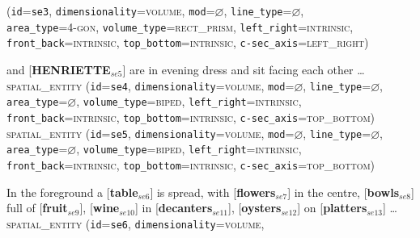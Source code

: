 \documentclass[11pt]{article}
\newcommand{\entity}[2]{[\textbf{\color{darkblue}#1}$_{se#2}$]}
\begin{document}
{            (\texttt{id}=\texttt{se3},
            \texttt{dimensionality}=\textsc{volume},
            \texttt{mod}=$\varnothing$,
            \texttt{line\_type}=$\varnothing$,\\
            \texttt{area\_type}=\textsc{4-gon},
            \texttt{volume\_type}=\textsc{rect\_prism},
            \texttt{left\_right}=\textsc{intrinsic},\\
            \texttt{front\_back}=\textsc{intrinsic},
            \texttt{top\_bottom}=\textsc{intrinsic},
            \texttt{c-sec\_axis}=\textsc{left\_right})
        \label{ex:sofa}
	\item \entity{MAURICE}{4} and \entity{HENRIETTE}{5} are in evening dress and sit facing each other \ldots\vspace{0.5em}\\
        \textsc{spatial\_entity}
            (\texttt{id}=\texttt{se4},
            \texttt{dimensionality}=\textsc{volume},
            \texttt{mod}=$\varnothing$,
            \texttt{line\_type}=$\varnothing$,\\
            \texttt{area\_type}=$\varnothing$,
            \texttt{volume\_type}=\textsc{biped},
            \texttt{left\_right}=\textsc{intrinsic},
            \texttt{front\_back}=\textsc{intrinsic},
            \texttt{top\_bottom}=\textsc{intrinsic},
            \texttt{c-sec\_axis}=\textsc{top\_bottom})\vspace{0.5em}\\
        \textsc{spatial\_entity}
            (\texttt{id}=\texttt{se5},
            \texttt{dimensionality}=\textsc{volume},
            \texttt{mod}=$\varnothing$,
            \texttt{line\_type}=$\varnothing$,\\
            \texttt{area\_type}=$\varnothing$,
            \texttt{volume\_type}=\textsc{biped},
            \texttt{left\_right}=\textsc{intrinsic},
            \texttt{front\_back}=\textsc{intrinsic},
            \texttt{top\_bottom}=\textsc{intrinsic},
            \texttt{c-sec\_axis}=\textsc{top\_bottom})        
        \label{ex:maurice_henriette}
    \item In the foreground a \entity{table}{6} is spread, with \entity{flowers}{7} in the centre, \entity{bowls}{8} full of \entity{fruit}{9}, \entity{wine}{10} in \entity{decanters}{11}, \entity{oysters}{12} on \entity{platters}{13} \ldots\vspace{0.5em}\\
        \textsc{spatial\_entity}
            (\texttt{id}=\texttt{se6},
            \texttt{dimensionality}=\textsc{volume},
}
\end{document}
